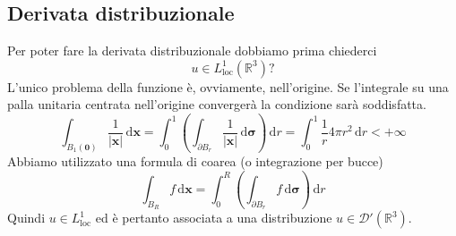 \documentclass[10pt,a4paper,twoside,openright]{book}
\newcommand{\x}{\mathbf{x}}
\newcommand{\zer}{\mathbf{0}}
\newcommand{\sigg}{\bm{\sigma}}
\newcommand{\de}{\,\mathrm d}
\newcommand{\dr}{\de r}
\newcommand{\dxx}{\de \x}
\newcommand{\dsig}{\de \sigg}
\begin{document}
\subsection{Derivata distribuzionale}

Per poter fare la derivata distribuzionale dobbiamo prima chiederci
\begin{equation*}
	u\in L^{1}_{\text{loc}}\left(\mathbb{R}^{3}\right) ?
\end{equation*}
L'unico problema della funzione è, ovviamente, nell'origine. Se l'integrale su una palla unitaria centrata nell'origine convergerà la condizione sarà soddisfatta.
\begin{equation*}
	\int _{B_{1}(\zer)}\frac{1}{| \x| } \dxx =\int ^{1}_{0}\left(\int _{\partial B_{r}}\frac{1}{| \x| } \dsig \right) \dr=\int ^{1}_{0}\frac{1}{r} 4\pi r^{2} \dr< +\infty 
\end{equation*}
Abbiamo utilizzato una formula di coarea (o integrazione per bucce) 
\begin{equation*}
	\int _{B_{R}} f\dxx =\int ^{R}_{0}\left(\int _{\partial B_{r}} f\dsig \right) \dr
\end{equation*}
Quindi $\displaystyle u\in L_{\text{loc}}^{1}$ ed è pertanto associata a una distribuzione $\displaystyle u\in \mathcal{D} '\left(\mathbb{R}^{3}\right)$.
\end{document}
